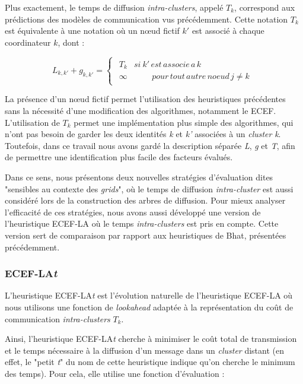 Plus exactement, le temps de diffusion \textit{intra-clusters}, appelé $T_{k}$,
correspond aux prédictions des modèles de communication vus précédemment. 
Cette notation $T_{k}$ est équivalente à une notation où un n{\oe}ud
fictif $k'$ est associé à chaque coordinateur $k$, dont :

\[
L_{k,k'}+g_{k,k'}=\left\{ \begin{array}{c}
\begin{array}{cc}
T_{k} & si\: k'\, est\, associe\, a\, k\\
\infty & \,\,\,\,\,\,\,\,\,\,\,\,\, pour\, tout\, autre\, noeud\, j\neq k\end{array}\end{array}\right.\]


La présence d'un n{\oe}ud fictif permet l'utilisation des heuristiques
précédentes sans la nécessité d'une modification des algorithmes,
notamment le ECEF. L'utilisation de $T_{k}$ permet une implémentation
plus simple des algorithmes, qui n'ont pas besoin de garder les deux
identités \emph{k} et \emph{k'} associées à un  \textit{cluster} \emph{k}. Toutefois, dans ce travail nous avons gardé
la description séparée \emph{L}, \emph{g} et \emph{T}, afin
de permettre une identification plus facile des facteurs évalués.

Dans ce sens, nous présentons deux nouvelles stratégies d'évaluation
dites "sensibles au contexte des \textit{grids}", où
le temps de diffusion \emph{intra-cluster} est aussi considéré lors
de la construction des arbres de diffusion. Pour mieux analyser l'efficacité
de ces stratégies, nous avons aussi développé une version de l'heuristique
ECEF-LA où le temps \textit{intra-clusters} est pris en compte. Cette version
sert de comparaison par rapport aux heuristiques de Bhat, présentées
précédemment. 


\subsubsection*{ECEF-LA\emph{t}}

L'heuristique ECEF-LA\emph{t} est l'évolution naturelle de l'heuristique
ECEF-LA où nous utilisons une fonction de \emph{lookahead} adaptée
à la représentation du coût de communication \textit{intra-clusters} $T_{k}$. 

Ainsi, l'heuristique ECEF-LA\emph{t} cherche à minimiser le coût total
de transmission et le temps nécessaire à la diffusion d'un message
dans un  \textit{cluster} distant (en effet, le "petit \emph{t}"
du nom de cette heuristique indique qu'on cherche le minimum des temps).
Pour cela, elle utilise une fonction d'évaluation :

